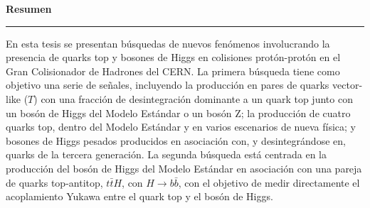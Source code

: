 \thispagestyle{plain}
\phantom{\tiny test}

\noindent \Huge{\textbf{Resumen}}
\begin{center}
\rule{\linewidth}{.4pt}
\end{center}

\normalsize
\vspace{0.7cm}

En esta tesis se presentan b\'usquedas de nuevos fen\'omenos involucrando la presencia de quarks top y bosones de Higgs en colisiones prot\'on-prot\'on en el Gran Colisionador de Hadrones del CERN.
La primera b\'usqueda tiene como objetivo una serie de se\~nales, incluyendo la producci\'on en pares de quarks vector-like ($T$) con una fracci\'on de desintegraci\'on dominante a un quark top junto con un bos\'on de Higgs del Modelo Est\'andar o un bos\'on Z; la producci\'on de cuatro quarks top, dentro del Modelo Est\'andar y en varios escenarios de nueva f\'isica; y  bosones de Higgs pesados producidos en asociaci\'on con, y desintegr\'andose en, quarks de la tercera generaci\'on.
La segunda b\'usqueda est\'a centrada en la producci\'on del bos\'on de Higgs del Modelo Est\'andar en asociaci\'on con una pareja de quarks top-antitop, 
$t\bar{t}H$, con $H\to b\bar{b}$, con el objetivo de medir directamente el acoplamiento Yukawa entre el quark top y el bos\'on de Higgs. \par

